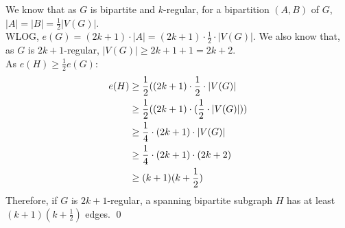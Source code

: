 \begin{enumerate}[a)]
    \unboldmath
    \linebreak 
    We know that as $G$ is bipartite and $k$-regular, for a bipartition $(A, B)$ of $G$, $|A| = |B| = \frac{1}{2}|V(G)|$. \\
    \linebreak 
    WLOG, $e(G) = (2k+1)\cdot|A| = (2k+1)\cdot\frac{1}{2}\cdot|V(G)|$. We also know that, as $G$ is $2k+1$-regular, $|V(G)| \geq 2k+1+1 = 2k+2$. \\
    \linebreak 
    As $e(H) \geq \frac{1}{2}e(G)$:
    \begin{align}
    \notag
    e(H) &\geq \frac{1}{2}((2k+1)\cdot\frac{1}{2}\cdot|V(G)| \\
    \notag
    & \geq \frac{1}{2}((2k+1)\cdot(\frac{1}{2}\cdot|V(G)|)) \\
    \notag
    & \geq \frac{1}{4}\cdot(2k +1)\cdot|V(G)| \\
    & \geq \frac{1}{4}\cdot(2k +1)\cdot(2k+2) \\
    \notag
    & \geq (k+1)(k+\frac{1}{2})
    \end{align}
    Therefore, if $G$ is $2k+1$-regular, a spanning bipartite subgraph $H$ has at least $(k+1)(k+\frac{1}{2})$ edges. 
    \qed  
\end{enumerate}